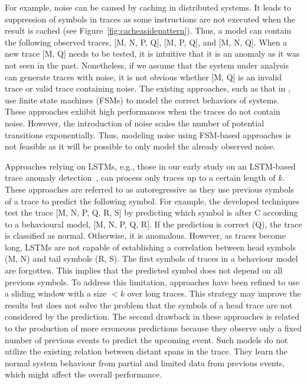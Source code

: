 For example, noise can be caused by caching in distributed systems. It leads to suppression of symbols in traces as some instructions are not executed when the result is cached (see Figure~\ref{fig:cacheasidepattern}). Thus, a model can contain the following observed traces, [M, N, P, Q], [M, P, Q], and [M, N, Q]. When a new trace [M, Q] needs to be tested, it is intuitive that it is an anomaly as it was not seen in the past. Nonetheless, if we assume that the system under analysis can generate traces with noise, it is not obvious whether [M, Q] is an invalid trace or valid trace containing noise. The existing approaches, such as that in \cite{RepTrace}, use finite state machines (FSMs) to model the correct behaviors of systems. These approaches exhibit high performances when the traces do not contain noise. However, the introduction of noise scales the number of potential transitions exponentially. Thus, modeling noise using FSM-based approaches is not feasible as it will be possible to only model the already observed noise.

Approaches relying on LSTMs, e.g., those in our early study on an LSTM-based trace anomaly detection~\cite{nedelkoski2019anomalymultimodal,nedelkoski2019anomaly}, can process only traces up to a certain length of $k$. These approaches are referred to as autoregressive as they use previous symbols of a trace to predict the following symbol. For example, the developed techniques test the trace [M, N, P, Q, R, S] by predicting which symbol is after C according to a behavioural model, [M, N, P, Q, R]. If the prediction is correct (Q), the trace is classified as normal. Otherwise, it is anomalous. However, as traces become long, LSTMs are not capable of establishing a correlation between head symbols (M, N) and tail symbols (R, S). The first symbols of traces in a behaviour model are forgotten. This implies that the predicted symbol does not depend on all previous symbols. To address this limitation, approaches have been refined to use a sliding window with a size $< k$ over long traces. This strategy may improve the results but does not solve the problem that the symbols of a head trace are not considered by the prediction. 
The second drawback in these approaches is related to the production of more erroneous predictions because they observe only a fixed number of previous events to predict the upcoming event. Such models do not utilize the existing relation between distant spans in the trace. They learn the normal system behaviour from partial and limited data from previous events, which might affect the overall performance.

